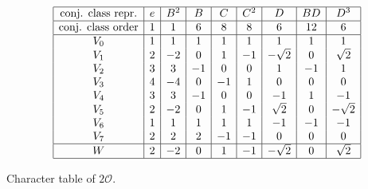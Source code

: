 \documentclass{worksheetclass}
\begin{document}
            \begin{table}[H]
                \centering
                {\small
                \begin{equation*}
                        \begin{array}{|c|c|c|c|c|c|c|c|c|}
                            \hline
                            \text{conj. class repr.} & e & B^2 & B & C & C^2 & D & BD & D^3 \\ \hline
                            \text{conj. class order} & 1 & 1 & 6 & 8 & 8 & 6 & 12 & 6\\
                            \hline
                            V_0 & 1 & 1 & 1 & 1 & 1 & 1 & 1 & 1 \\
                            V_1 & 2 & -2 & 0 & 1 & -1 & -\sqrt{2} & 0 & \sqrt{2} \\
                            V_2 & 3 & 3 & -1 & 0 & 0 & 1 & -1 & 1 \\
                            V_3 & 4 & -4 & 0 & -1 & 1 & 0 & 0 & 0 \\
                            V_4 & 3 & 3 & -1 & 0 & 0 & -1 & 1 & -1 \\
                            V_5 & 2 & -2 & 0 & 1 & -1 & \sqrt{2} & 0 & -\sqrt{2} \\
                            V_6 & 1 & 1 & 1 & 1 & 1 & -1 & -1 & -1 \\
                            V_7 & 2 & 2 & 2 & -1 & -1 & 0 & 0 & 0 \\ \hline
                            W & 2 & -2 & 0 & 1 & -1 & -\sqrt{2} & 0 & \sqrt{2} \\ \hline
                        \end{array}
                    \end{equation*}}
                \caption{Character table of $2\mathcal{O}$.}
            \end{table}
\end{document}
